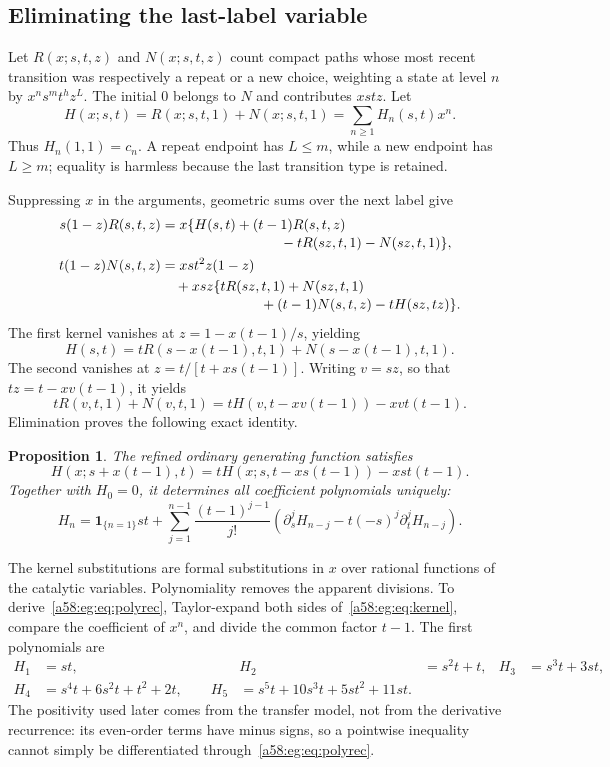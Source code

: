 \documentclass[11pt,letterpaper]{article}
\newtheorem{proposition}[theorem]{Proposition}
\theoremstyle{remark}
\newcommand{\ind}[1]{\mathbf1_{\{#1\}}}
\begin{document}
\subsection{Eliminating the last-label variable}
Let $R(x;s,t,z)$ and $N(x;s,t,z)$ count compact paths whose most recent transition was respectively a repeat or a new choice, weighting a state at level $n$ by $x^ns^mt^hz^L$. The initial 0 belongs to $N$ and contributes $xstz$. Let
\[
 H(x;s,t)=R(x;s,t,1)+N(x;s,t,1)=\sum_{n\ge1}H_n(s,t)x^n.
\]
Thus $H_n(1,1)=c_n$. A repeat endpoint has $L\le m$, while a new endpoint has $L\ge m$; equality is harmless because the last transition type is retained.

Suppressing $x$ in the arguments, geometric sums over the next label give
\begin{align}
 s(1-z)R(s,t,z)
 &=x\{H(s,t)+(t-1)R(s,t,z)\notag\\[-2pt]
 &\hspace{30mm}-tR(sz,t,1)-N(sz,t,1)\},\label{a58:eg:eq:Rkernel}\\
 t(1-z)N(s,t,z)
 &=xst^2z(1-z)\notag\\
 &\quad+xsz\{tR(sz,t,1)+N(sz,t,1)\notag\\[-2pt]
 &\hspace{25mm}+(t-1)N(s,t,z)-tH(sz,tz)\}.\label{a58:eg:eq:Nkernel}
\end{align}
The first kernel vanishes at $z=1-x(t-1)/s$, yielding
\[
 H(s,t)=tR(s-x(t-1),t,1)+N(s-x(t-1),t,1).
\]
The second vanishes at $z=t/[t+xs(t-1)]$. Writing $v=sz$, so that $tz=t-xv(t-1)$, it yields
\[
 tR(v,t,1)+N(v,t,1)=tH(v,t-xv(t-1))-xvt(t-1).
\]
Elimination proves the following exact identity.
\begin{proposition}\label{a58:eg:prop:kernel}
The refined ordinary generating function satisfies
\begin{equation}\label{a58:eg:eq:kernel}
 H(x;s+x(t-1),t)
 =tH(x;s,t-xs(t-1))-xst(t-1).
\end{equation}
Together with $H_0=0$, it determines all coefficient polynomials uniquely:
\begin{equation}\label{a58:eg:eq:polyrec}
 H_n=\ind{n=1}st+
 \sum_{j=1}^{n-1}\frac{(t-1)^{j-1}}{j!}
 \left(\partial_s^jH_{n-j}-t(-s)^j\partial_t^jH_{n-j}\right).
\end{equation}
\end{proposition}
The kernel substitutions are formal substitutions in $x$ over rational functions of the catalytic variables. Polynomiality removes the apparent divisions. To derive~\eqref{a58:eg:eq:polyrec}, Taylor-expand both sides of~\eqref{a58:eg:eq:kernel}, compare the coefficient of $x^n$, and divide the common factor $t-1$. The first polynomials are
\begin{align*}
 H_1&=st, & H_2&=s^2t+t, & H_3&=s^3t+3st,\\
 H_4&=s^4t+6s^2t+t^2+2t,\qquad
 H_5&=s^5t+10s^3t+5st^2+11st.
\end{align*}
The positivity used later comes from the transfer model, not from the derivative recurrence: its even-order terms have minus signs, so a pointwise inequality cannot simply be differentiated through~\eqref{a58:eg:eq:polyrec}.
\end{document}
